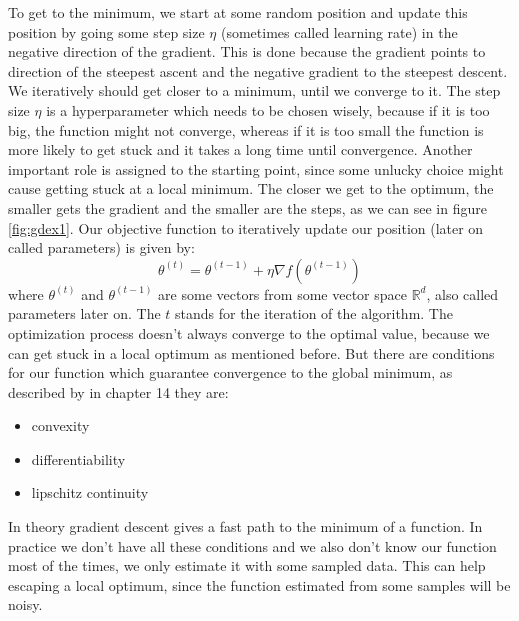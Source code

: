 \documentclass[aodsor,preprint]{imsart}
\numberwithin{equation}{section}
\theoremstyle{plain}
\begin{document}
To get to the minimum, we start at some random position and update this position by going some step size $\eta$ (sometimes called learning rate) in the negative direction of the gradient. This is done because the gradient points to direction of the steepest ascent and the negative gradient to the steepest descent. We iteratively should get closer to a minimum, until we converge to it. The step size $\eta$ is a hyperparameter which needs to be chosen wisely, because if it is too big, the function might not converge, whereas if it is too small the function is more likely to get stuck and it takes a long time until convergence. Another important role is assigned to the starting point, since some unlucky choice might cause getting stuck at a local minimum. The closer we get to the optimum, the smaller gets the gradient and the smaller are the steps, as we can see in figure \ref{fig:gdex1}. Our objective function to iteratively update our position (later on called parameters) is given by:
\begin{equation} \label{eq:gd}
\theta^{(t)} = \theta^{(t-1)} + \eta \nabla f(\theta^{(t-1)})
\end{equation}
where $\theta^{(t)}$ and $\theta^{(t-1)}$ are some vectors from some vector space $\mathbb{R}^d$, also called parameters later on. The $t$ stands for the iteration of the algorithm. The optimization process doesn't always converge to the optimal value, because we can get stuck in a local optimum as mentioned before. But there are conditions for our function which guarantee convergence to the global minimum, as described by \cite{shalev} in chapter 14 they are: 

\begin{center}
\begin{itemize}
\item convexity
\item differentiability
\item lipschitz continuity
\end{itemize}
\end{center}

In theory gradient descent gives a fast path to the minimum of a function. In practice we don't have all these conditions and we also don't know our function most of the times, we only estimate it with some sampled data. This can help escaping a local optimum, since the function estimated from some samples will be noisy.
\end{document}
